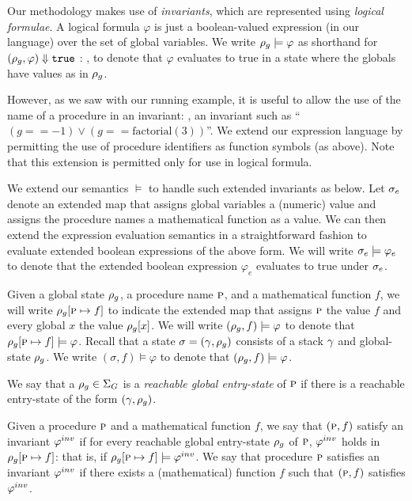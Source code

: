 Our methodology makes use of \emph{invariants}, which are represented using \emph{logical formulae}.
A  logical formula $\varphi$ is just a boolean-valued expression (in our language) over the set of global variables.
We write $\rho_g \models \varphi$ as shorthand for $({\rho_g},{\varphi}) \Downarrow {\texttt{true}}$ :
\ie, to denote that $\varphi$ evaluates to true in a state where the globals have values as in $\rho_g$.

However, as we saw with our running example, it is useful to allow the use of the name of a procedure in
an invariant: \eg, an invariant such as ``$(g == -1) \vee (g == \text{factorial}(3))$''.
We extend our expression language by permitting the use of procedure identifiers as
function symbols (as above). Note that this extension is permitted only for use in logical
formula.

We extend our semantics $\models$ to handle such extended invariants as below.
Let $\sigma_e$ denote an extended map that assigns global variables a (numeric) value and assigns the
procedure names a mathematical function as a value. We can then extend the expression evaluation semantics
in a straightforward fashion to evaluate extended boolean expressions of the above form. 
We will write $\sigma_e \models \varphi_e$ to denote that the extended boolean expression $\varphi_e$
evaluates to true under $\sigma_e$.

Given a global state $\rho_g$, a procedure name $\textsc{p}$, and a mathematical function $f$, we will write
$\rho_g[\textsc{p} \mapsto f]$ to indicate the extended map that assigns $\textsc{p}$ the value $f$ and every
global $x$ the value $\rho_g[x]$.
We will write $(\rho_g,f) \models \varphi$ to denote that $\rho_g[\textsc{p} \mapsto f] \models \varphi$.
Recall that a state $\sigma =(\gamma,\rho_g)$ consists of a stack $\gamma$ and global-state $\rho_g$.
We write $(\sigma,f) \models \varphi$ to denote that $(\rho_g,f) \models \varphi$.

We say that a $\rho_g \in \Sigma_G$ is a \emph{reachable global entry-state} of $\textsc{p}$ if
there is a reachable entry-state of the form $(\gamma,\rho_g)$.

\begin{definition}[Invariant]
Given a procedure $\textsc{p}$ and a mathematical function $f$, we say that $(\textsc{p},f)$ satisfy
an invariant $\varphi^{inv}$ if for every reachable global entry-state $\rho_g$ of $\textsc{p}$,
$\varphi^{inv}$ holds in $\rho_g[\textsc{p} \mapsto f]$: that is, if $\rho_g[\textsc{p} \mapsto f] \models \varphi^{inv}$.
We say that procedure $\textsc{p}$ satisfies an invariant $\varphi^{inv}$ if there exists a (mathematical)
function $f$ such that $(\textsc{p},f)$ satisfies $\varphi^{inv}$.
\end{definition}
